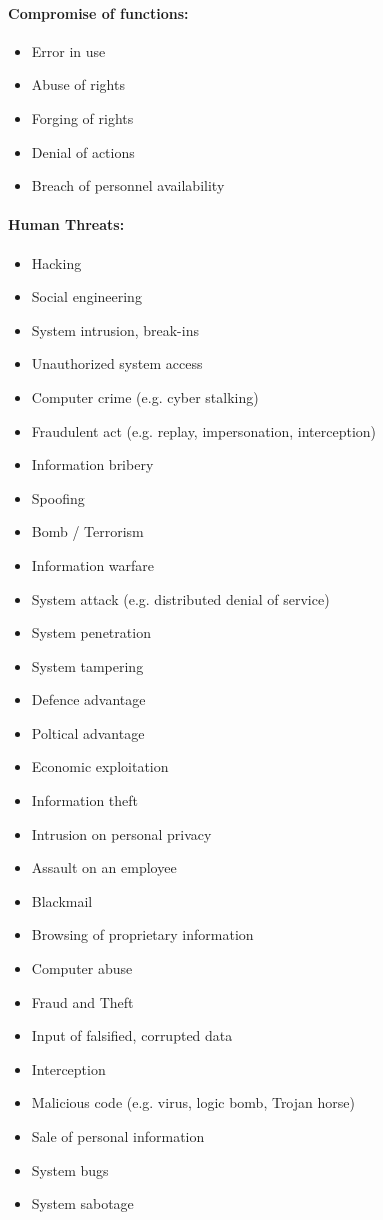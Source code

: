 \documentclass[10pt,a4paper]{article}
\begin{document}
\begin{multicols}{2}
\paragraph*{Compromise of functions:}
\begin{itemize}[noitemsep,topsep=0pt,leftmargin=*]
    \item Error in use
    \item Abuse of rights
    \item Forging of rights
    \item Denial of actions
    \item Breach of personnel availability
\end{itemize}

\paragraph*{Human Threats:}
\begin{itemize}[noitemsep,topsep=0pt,leftmargin=*]
    \item Hacking
    \item Social engineering
    \item System intrusion, break-ins
    \item Unauthorized system access
    \item Computer crime (e.g. cyber stalking)
    \item Fraudulent act (e.g. replay,
    impersonation, interception)
    \item Information bribery
    \item Spoofing
    \item Bomb / Terrorism
    \item Information warfare
    \item System attack (e.g. distributed denial of
    service)
    \item System penetration
    \item System tampering
    \item Defence advantage
    \item Poltical advantage
    \item Economic exploitation
    \item Information theft
    \item Intrusion on personal privacy
    \item Assault on an employee
    \item Blackmail
    \item Browsing of proprietary information
    \item Computer abuse
    \item Fraud and Theft
    \item Input of falsified, corrupted data
    \item Interception
    \item Malicious code (e.g. virus, logic bomb,
    Trojan horse)
    \item Sale of personal information
    \item System bugs
    \item System sabotage
\end{itemize}
\end{multicols}
\end{document}
